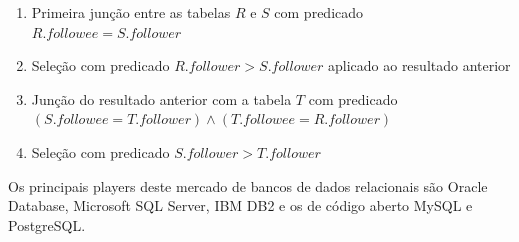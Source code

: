 \begin{enumerate}
\item Primeira junção entre as tabelas $R$ e $S$ com predicado $R.followee = S.follower$
\item Seleção com predicado $R.follower > S.follower$ aplicado ao resultado anterior
\item Junção do resultado anterior com a tabela $T$ com predicado $(S.followee = T.follower) \land (T.followee = R.follower)$
\item Seleção com predicado $S.follower > T.follower$
\end{enumerate}

Os principais players deste mercado de bancos de dados relacionais são Oracle Database, Microsoft 
SQL Server, IBM DB2 e os de código aberto MySQL e PostgreSQL. 

